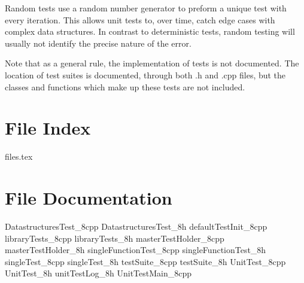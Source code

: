 	Random tests use a random number generator to preform a unique test with every iteration.  This allows unit tests to, over time, catch edge cases with complex data structures.  In contrast to deterministic tests, random testing will usually not identify the precise nature of the error.

	Note that as a general rule, the implementation of tests is not documented.  The location of test suites is documented, through both .h and .cpp files, but the classes and functions which make up these tests are not included.

	\renewcommand{\DOXYGENFOLDER}{../../UnitTest/Documentation/doxygenFiles/latex/}
	\chapter{File Index}
		{files.tex}
		
	\chapter{File Documentation}
		{DatastructuresTest_8cpp}
		{DatastructuresTest_8h}
		{defaultTestInit_8cpp}
		{libraryTests_8cpp}
		{libraryTests_8h}
		{masterTestHolder_8cpp}
		{masterTestHolder_8h}
		{singleFunctionTest_8cpp}
		{singleFunctionTest_8h}
		{singleTest_8cpp}
		{singleTest_8h}
		{testSuite_8cpp}
		{testSuite_8h}
		{UnitTest_8cpp}
		{UnitTest_8h}
		{unitTestLog_8h}
		{UnitTestMain_8cpp}
		
